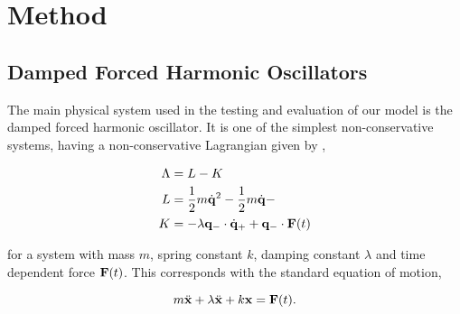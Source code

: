 \section{Method}
%

\subsection{Damped Forced Harmonic Oscillators}
\label{sec:eg-sys}

The main physical system used in the testing and evaluation of our model is the damped forced harmonic oscillator. It is one of the simplest non-conservative systems, having a non-conservative Lagrangian given by \cite{galleyPrincipleStationaryNonconservative2014},

\begin{equation}
\label{eq:dho-sys-embedding}
\begin{aligned}
  \Lambda &= L - K \\
  L &= \frac12 m\dot{\vb{q}}^2 - \frac12 m\dot{\vb{q}} -  \\
  K &= - \lambda\vb{q}_- \cdot \dot {\vb{q}}_+ + \vb{q}_- \cdot \vb{F}(t)
\end{aligned}
\end{equation}

for a system with mass $m$, spring constant $k$, damping constant $\lambda$ and time dependent force $\vb{F}(t)$. This corresponds with the standard equation of motion,

\begin{equation}
  m \ddot{\vb x} + \lambda \ddot{\vb x} + k \vb x = \vb F(t).
\end{equation}

%


